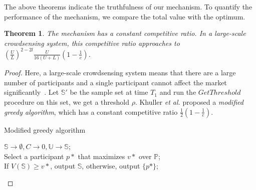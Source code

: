 \documentclass[conference,compsocconf,letterpaper,10pt]{IEEEtran}
\newtheorem{theorem}{Theorem}
\newcommand{\et}{{\em et al. }}
\begin{document}
The above theorems indicate the truthfulness of our mechanism. To quantify the performance of the mechanism, we compare the total value with the optimum.

\begin{theorem}
The mechanism has a constant competitive ratio. In a large-scale crowdsensing system, this competitive ratio approaches to $\left(\frac{U}{L}\right)^{2-2l}\frac{U}{16(U+L)}(1-\frac{1}{e})$.
\end{theorem}
\begin{proof}
Here, a large-scale crowdsensing system means that there are a large number of participants and a single participant cannot affect the market significantly~\cite{6979011}. Let $\mathbb{S}'$ be the sample set at time $T_1$ and run the $GetThreshold$ procedure on this set, we get a threshold $\rho$. Khuller \et\cite{khuller1999budgeted} proposed a \emph{modified greedy algorithm}, which has a constant competitive ratio $\frac{1}{2}(1-\frac{1}{e})$. 

\begin{algorithm}
\BlankLine
{}
\caption{Modified greedy algorithm}
\label{alg:greedy}
\begin{small}
\BlankLine
$\mathbb{S}\rightarrow\emptyset,C\rightarrow 0,\mathbb{U}\rightarrow\mathbb{S}$;\\
Select a participant $p*$ that maximizes $v*$ over $\mathbb{P}$;\\
If $V(\mathbb{S})\ge v*$, output $\mathbb{S}$, otherwise, output $\{p*\}$;
\end{small}
\end{algorithm}





\end{proof}
\end{document}
